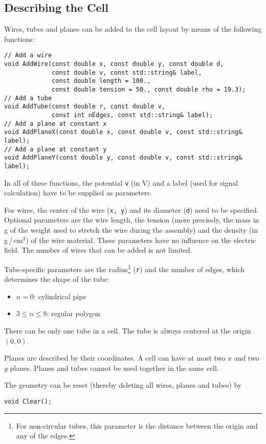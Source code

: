 \subsection{Describing the Cell}

Wires, tubes and planes can be added to the cell layout by means of the 
following functions:
\begin{lstlisting}
// Add a wire
void AddWire(const double x, const double y, const double d,
             const double v, const std::string& label, 
             const double length = 100.,
             const double tension = 50., const double rho = 19.3);
// Add a tube
void AddTube(const double r, const double v, 
             const int nEdges, const std::string& label);
// Add a plane at constant x
void AddPlaneX(const double x, const double v, const std::string& label);
// Add a plane at constant y
void AddPlaneY(const double y, const double v, const std::string& label);

\end{lstlisting} 

In all of these functions, the potential \texttt{v} (in V) 
and a label (used for signal calculation) 
have to be supplied as parameters.
 
For wires, the center of the wire (\texttt{x, y}) 
and its diameter (\texttt{d}) need to be specified. 
Optional parameters are the wire length, the tension (more precisely, the 
mass in g of the weight used to stretch the wire during the assembly) and 
the density (in g\,/\,cm\(^{3}\)) of the wire material. 
These parameters have no influence on the electric field. 
The number of wires that can be added is not limited.

Tube-specific parameters are the radius\footnote{For non-circular tubes, this parameter is the distance between the origin and any of the edges.} (\texttt{r}) and the number of edges, which determines the shape of the tube:
  \begin{itemize}
    \item
    \(n = 0\): cylindrical pipe
    \item
    \(3 \le n \le 8\): regular polygon 
  \end{itemize}
There can be only one tube in a cell. 
The tube is always centered at the origin \(\left(0, 0\right)\).

Planes are described by their coordinates. 
A cell can have at most two \(x\) and two \(y\) planes. 
Planes and tubes cannot be used together in the same cell.

The geometry can be reset (thereby deleting all wires, planes and tubes) by
\begin{lstlisting}
void Clear();
\end{lstlisting}

